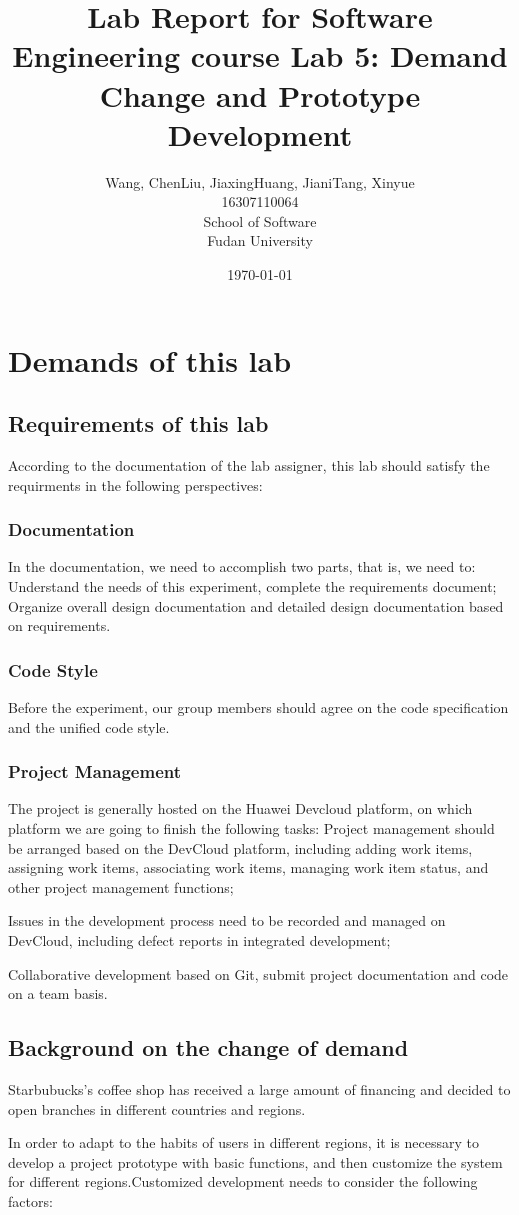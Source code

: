 \documentclass[a4paper]{report}
\title{Lab Report for Software Engineering course \newline
 Lab 5: Demand Change and Prototype Development}
\author{Wang, Chen\qquad Liu, Jiaxing\qquad Huang, Jiani\qquad Tang, Xinyue \\
16307110064\qquad17302010049\qquad 17302010063\qquad 16307110476 \\
School of Software\\
Fudan University
}
\date{\today}
\begin{document}
\maketitle

\tableofcontents
\chapter{Demands of this lab}
\section{Requirements of this lab}
According to the documentation of the lab assigner, this lab should satisfy the requirments in the following perspectives:
\subsection{Documentation}
In the documentation, we need to accomplish two parts, that is, we need to:
Understand the needs of this experiment, complete the requirements document;
Organize overall design documentation and detailed design documentation based on requirements.
\subsection{Code Style}
Before the experiment, our group members should agree on the code specification and the unified code style.
\subsection{Project Management}
The project is generally hosted on the Huawei Devcloud platform, on which platform we are going to finish the following tasks:
Project management should be arranged based on the DevCloud platform, including adding work items, assigning work items, associating work items, managing work item status, and other project management functions;
\par
Issues in the development process need to be recorded and managed on DevCloud, including defect reports in integrated development;
\par
Collaborative development based on Git, submit project documentation and code on a team basis.

\section{Background on the change of demand}
Starbubucks's coffee shop has received a large amount of financing and decided to open branches in different countries and regions.
\par
In order to adapt to the habits of users in different regions, it is necessary to develop a project prototype with basic functions, and then customize the system for different regions.Customized development needs to consider the following factors:
\end{document}
